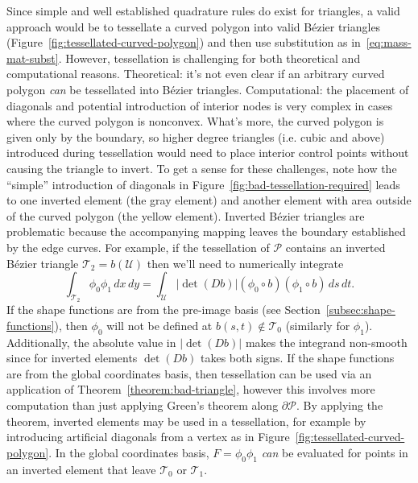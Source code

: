 \documentclass[oneside, reqno]{amsart}
\theoremstyle{definition}
\newcommand{\utri}{\mathcal{U}}
\begin{document}
Since simple and well established quadrature rules do exist for triangles,
a valid approach would be
to tessellate a curved polygon into valid B\'{e}zier triangles
(Figure~\ref{fig:tessellated-curved-polygon}) and then use substitution as
in~\eqref{eq:mass-mat-subst}. However, tessellation is challenging for both
theoretical and computational reasons.
Theoretical: it's not even clear if an arbitrary curved polygon \emph{can}
be tessellated into B\'{e}zier triangles. Computational: the placement
of diagonals and potential introduction of interior nodes is very
complex in cases where the curved polygon is nonconvex. What's more,
the curved polygon is given only by the boundary, so higher degree triangles
(i.e. cubic and above) introduced during tessellation would need to place
interior control points without causing the triangle to invert. To get a
sense for these challenges, note how the ``simple'' introduction of
diagonals in Figure~\ref{fig:bad-tessellation-required} leads to one
inverted element (the gray element) and another element with area outside
of the curved polygon (the yellow element). Inverted B\'{e}zier triangles
are problematic because the accompanying mapping leaves the boundary
established by the edge curves. For example,
if the tessellation of \(\mathcal{P}\) contains an inverted
B\'{e}zier triangle \(\mathcal{T}_2 = b\left(\utri\right)\) then we'll
need to numerically integrate
\begin{equation}
\int_{\mathcal{T}_2} \phi_0 \phi_1 \, dx \, dy =
  \int_{\utri} \left|\det(Db)\right| \left(\phi_0 \circ b\right)
  \left(\phi_1 \circ b\right) \, ds \, dt.
\end{equation}
If the shape functions are from the pre-image basis (see
Section~\ref{subsec:shape-functions}), then \(\phi_0\)
will not be defined at \(b(s, t) \not\in \mathcal{T}_0\) (similarly for
\(\phi_1\)). Additionally, the absolute value in \(\left|\det(Db)\right|\)
makes the integrand non-smooth since for inverted elements
\(\det(Db)\) takes both signs. If the shape functions are from the
global coordinates basis, then tessellation can be used via an
application of Theorem~\ref{theorem:bad-triangle}, however this involves
more computation than just applying Green's theorem along
\(\partial \mathcal{P}\). By applying the theorem, inverted elements may
be used in a tessellation, for example by introducing artificial
diagonals from a vertex as in Figure~\ref{fig:tessellated-curved-polygon}.
In the global coordinates basis, \(F = \phi_0 \phi_1\) \emph{can}
be evaluated for points in an inverted element that leave
\(\mathcal{T}_0\) or \(\mathcal{T}_1\).
\end{document}
